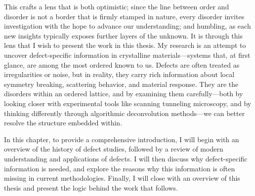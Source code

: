 This crafts a lens that is both optimistic; since the line between order and disorder is not a border that is firmly stamped in nature, every disorder invites investigation with the hope to advance our understanding; and humbling, as each new insights typically exposes further layers of the unknown. It is through this lens that I wish to present the work in this thesis. My research is an attempt to uncover defect-specific information in crystalline materials—systems that, at first glance, are among the most ordered known to us. Defects are often treated as irregularities or noise, but in reality, they carry rich information about local symmetry breaking, scattering behavior, and material response. They are the disorders within an ordered lattice, and by examining them carefully—both by looking closer with experimental tools like scanning tunneling microscopy, and by thinking differently through algorithmic deconvolution methods—we can better resolve the structure embedded within. 

In this chapter, to provide a comprehensive introduction, I will begin with an overview of the history of defect studies, followed by a review of modern understanding and applications of defects. I will then discuss why defect-specific information is needed, and explore the reasons why this information is often missing in current methodologies. Finally, I will close with an overview of this thesis and present the logic behind the work that follows.
